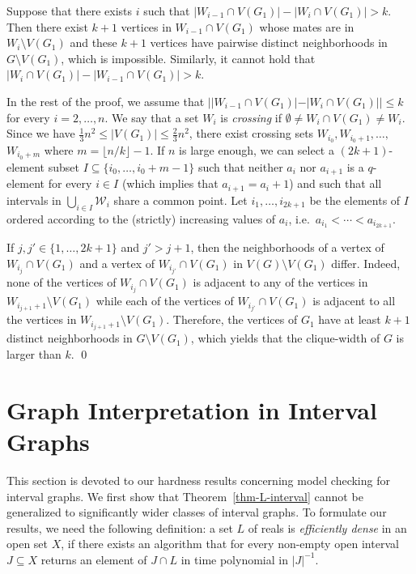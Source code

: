 \documentclass{CSML}
\def\ca#1{{\mathcal#1}}
\let\sem\setminus
\theoremstyle{plain}\newtheorem{claim}[thm]{Claim}
\begin{document}
Suppose that there exists $i$ such that $|W_{i-1}\cap V(G_1)|-|W_{i}\cap V(G_1)|>k$.
Then there exist $k+1$ vertices in $W_{i-1}\cap V(G_1)$ whose mates are in $W_{i}\sem V(G_1)$ and
these $k+1$ vertices have pairwise distinct neighborhoods in $G\setminus V(G_1)$,
which is impossible.
Similarly, it cannot hold that $|W_{i}\cap V(G_1)|-|W_{i-1}\cap V(G_1)|>k$.

In the rest of the proof, we assume that $||W_{i-1}\cap V(G_1)|-|W_{i}\cap V(G_1)||\le k$ for every $i=2,\ldots,n$.
We say that a set $W_i$ is {\em crossing} if $\emptyset\not=W_i\cap V(G_1)\not=W_i$.
Since we have $\frac13 n^2\le |V(G_1)|\le \frac23 n^2$,
there exist crossing sets $W_{i_0},W_{i_0+1},\dots,$ $W_{i_0+m}$ where $m=\lfloor n/k\rfloor-1$.
If $n$ is large enough,
we can select a $(2k+1)$-element subset $I\subseteq\{i_0,\dots,i_0+m-1\}$
such that neither $a_i$ nor $a_{i+1}$ is a $q$-element for every $i\in I$ (which implies that $a_{i+1}=a_i+1$) and
such that all intervals in $\bigcup_{i\in I}\ca W_i$ share a common point.
Let $i_1,\ldots,i_{2k+1}$ be the elements of $I$ ordered according to the (strictly) increasing values of $a_i$,
i.e.~$a_{i_1}<\cdots<a_{i_{2k+1}}$.

If $j,j'\in\{1,\ldots,2k+1\}$ and $j'>j+1$,
then the neighborhoods of a vertex of $W_{i_j}\cap V(G_1)$ and a vertex of $W_{i_{j'}}\cap V(G_1)$ in $V(G)\sem V(G_1)$ differ.
Indeed, none of the vertices of $W_{i_j}\cap V(G_1)$ is adjacent to any of the vertices in $W_{i_{j+1}+1}\sem V(G_1)$
while each of the vertices of $W_{i_{j'}}\cap V(G_1)$ is adjacent to all the vertices in $W_{i_{j+1}+1}\sem V(G_1)$.
Therefore, the vertices of $G_1$ have at least $k+1$ distinct neighborhoods in $G\setminus V(G_1)$, 
which yields that the clique-width of $G$ is larger than $k$.
\qed


\section{Graph Interpretation in Interval Graphs}
\label{sec:interpret}


This section is devoted to our hardness results concerning model checking for interval graphs.
We first show that Theorem~\ref{thm-L-interval} cannot be generalized to significantly wider classes of interval graphs.
To formulate our results, we need the following definition:
a set $L$ of reals is {\em efficiently dense} in an open set $X$,
if there exists an algorithm that for every non-empty open interval $J\subseteq X$ returns an element of $J\cap L$
in time polynomial in $|J|^{-1}$.
\end{document}
